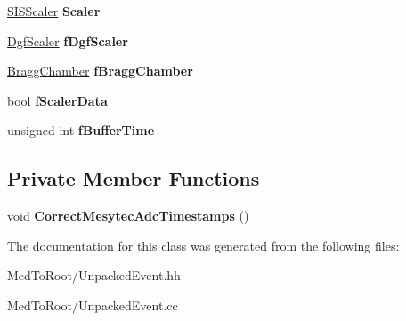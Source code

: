 \begin{DoxyCompactItemize}
\hyperlink{class_s_i_s_scaler}{S\+I\+S\+Scaler} {\bfseries Scaler}
\item 
\mbox{\label{class_unpacked_event_ad0a12f7dec89cf5cad8f7df4c2fe5013}} 
\hyperlink{class_dgf_scaler}{Dgf\+Scaler} {\bfseries f\+Dgf\+Scaler}
\item 
\mbox{\label{class_unpacked_event_ac705f3a8de8500aeb6f7cb3951b76d0e}} 
\hyperlink{class_bragg_chamber}{Bragg\+Chamber} {\bfseries f\+Bragg\+Chamber}
\item 
\mbox{\label{class_unpacked_event_a13011a375b40157797fbd84e4a4fd092}} 
bool {\bfseries f\+Scaler\+Data}
\item 
\mbox{\label{class_unpacked_event_a46e5d49e6b7fb87cf00e4feb03c2b875}} 
unsigned int {\bfseries f\+Buffer\+Time}
\end{DoxyCompactItemize}
\subsection*{Private Member Functions}
\begin{DoxyCompactItemize}
\item 
\mbox{\label{class_unpacked_event_af6a5c2addbb7e825c9c850e2d7a06c06}} 
void {\bfseries Correct\+Mesytec\+Adc\+Timestamps} ()
\end{DoxyCompactItemize}


The documentation for this class was generated from the following files\+:\begin{DoxyCompactItemize}
\item 
Med\+To\+Root/Unpacked\+Event.\+hh\item 
Med\+To\+Root/Unpacked\+Event.\+cc\end{DoxyCompactItemize}
